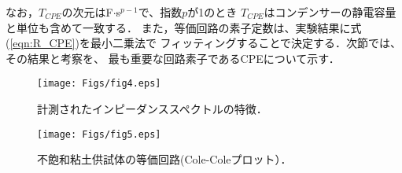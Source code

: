 \documentclass{jsce}
\begin{document}
なお，$T_{CPE}$の次元はF$\cdot$s$^{p-1}$で、指数$p$が1のとき
$T_{CPE}$はコンデンサーの静電容量と単位も含めて一致する．
また，等価回路の素子定数は、実験結果に式(\ref{eqn:R_CPE})を最小二乗法で
フィッティングすることで決定する．次節では、その結果と考察を、
最も重要な回路素子であるCPEについて示す．
\begin{figure}[h]
	\begin{center}
	\texttt{[image: Figs/fig4.eps]} 
	\end{center}
	\caption{
		計測されたインピーダンススペクトルの特徴．
	} 
	\label{fig:fig4}
\end{figure}
\begin{figure}[h]
	\begin{center}
	\texttt{[image: Figs/fig5.eps]} 
	\end{center}
	\caption{
		不飽和粘土供試体の等価回路(Cole-Coleプロット）．
	} 
	\label{fig:fig5}
\end{figure}
\end{document}
